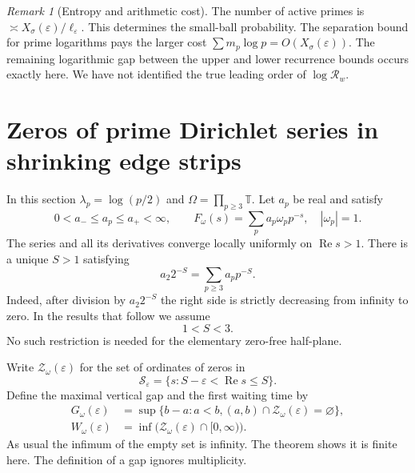 \documentclass[11pt,letterpaper]{article}
\theoremstyle{definition}
\theoremstyle{remark}
\newtheorem{remark}[theorem]{Remark}
\newcommand{\T}{\mathbb T}
\newcommand{\eps}{\varepsilon}
\newcommand{\Ree}{\operatorname{Re}}
\newcommand{\1}{\mathbf 1}
\begin{document}
\begin{remark}[Entropy and arithmetic cost]
The number of active primes is $\asymp X_\sigma(\eps)/\ell_\eps$.
This determines the small-ball probability. The separation bound for
prime logarithms pays the larger cost
$\sum m_p\log p=O(X_\sigma(\eps))$. The remaining logarithmic gap
between the upper and lower recurrence bounds occurs exactly here.
We have not identified the true leading order of $\log\mathcal R_w$.
\end{remark}

\section{Zeros of prime Dirichlet series in shrinking edge strips}\label{sec:prime-edge-statements}

In this section $\lambda_p=\log(p/2)$ and $\Omega=\prod_{p\ge3}\T$.
Let $a_p$ be real and satisfy
\begin{equation}\label{p01:eq:amplitudes}
 0<a_-\le a_p\le a_+<\infty,
 \qquad F_\omega(s)=\sum_p a_p\omega_pp^{-s},\quad|\omega_p|=1.
\end{equation}
The series and all its derivatives converge locally uniformly on
$\Ree s>1$. There is a unique $S>1$ satisfying
\begin{equation}\label{p01:eq:edge}
 a_2 2^{-S}=\sum_{p\ge3}a_pp^{-S}.
\end{equation}
Indeed, after division by $a_2 2^{-S}$ the right side is strictly
decreasing from infinity to zero. In the results that follow we assume
\begin{equation}\label{p01:eq:edgerange}
 1<S<3.
\end{equation}
No such restriction is needed for the elementary zero-free half-plane.

Write $\mathcal Z_\omega(\eps)$ for the set of ordinates of zeros in
\[
 \mathcal S_\eps=\{s:S-\eps<\Ree s\le S\}.
\]
Define the maximal vertical gap and the first waiting time by
\begin{align}
 G_\omega(\eps)&=\sup\{b-a:a<b,
              (a,b)\cap\mathcal Z_\omega(\eps)=\varnothing\},
 \label{p01:eq:gapdef}\\
 W_\omega(\eps)&=\inf\bigl(\mathcal Z_\omega(\eps)\cap[0,\infty)\bigr).
 \label{p01:eq:waitdef}
\end{align}
As usual the infimum of the empty set is infinity. The theorem shows it
is finite here. The definition of a gap ignores multiplicity.
\end{document}
